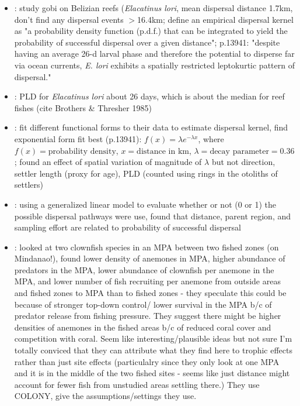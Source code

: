 \documentclass[12pt, oneside]{article}   	%
\begin{document}
\begin{itemize}
\item \cite{d2015patterns}: study gobi on Belizian reefs (\textit{Elacatinus lori}, mean dispersal distance 1.7km, don't find any dispersal events $>$16.4km; define an empirical dispersal kernel as "a probability density function (p.d.f.) that can be integrated to yield the probability of successful dispersal over a given distance"; p.13941: "despite having an average 26-d larval phase and therefore the potential to disperse far via ocean currents, \textit{E. lori} exhibits a spatially restricted leptokurtic pattern of dispersal."
\item \cite{d2015patterns}: PLD for \textit{Elacatinus lori} about 26 days, which is about the median for reef fishes (cite Brothers \& Thresher 1985)
\item \cite{d2015patterns}: fit different functional forms to their data to estimate dispersal kernel, find exponential form fit best (p.13941): $f(x) = \lambda e^{-\lambda x}$, where $f(x) = \text{probability density}$, $x = \text{distance in km}$, $\lambda = \text{decay parameter} = 0.36$; found an effect of spatial variation of magnitude of $\lambda$ but not direction, settler length (proxy for age), PLD (counted using rings in the otoliths of settlers)
\item \cite{d2015patterns}: using a generalized linear model to evaluate whether or not (0 or 1) the possible dispersal pathways were use, found that distance, parent region, and sampling effort are related to probability of successful dispersal
\item \cite{sato2017marine}: looked at two clownfish species in an MPA between two fished zones (on Mindanao!), found lower density of anemones in MPA, higher abundance of predators in the MPA, lower abundance of clownfish per anemone in the MPA, and lower number of fish recruiting per anemone from outside areas and fished zones to MPA than to fished zones - they speculate this could be because of stronger top-down control/ lower survival in the MPA b/c of predator release from fishing pressure. They suggest there might be higher densities of anemones in the fished areas b/c of reduced coral cover and competition with coral. Seem like interesting/plausible ideas but not sure I'm totally conviced that they can attribute what they find here to trophic effects rather than just site effects (particulalry since they only look at one MPA and it is in the middle of the two fished sites - seems like just distance might account for fewer fish from unstudied areas settling there.) They use COLONY, give the assumptions/settings they use.
\end{itemize}
\end{document}
